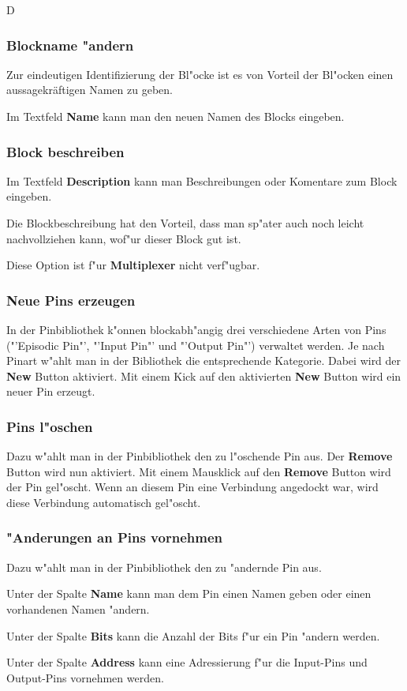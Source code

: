 \documentclass[a4paper,titlepage,12pt,ngerman]{scrbook}
\begin{document}
D
\subsubsection{Blockname "andern}
Zur eindeutigen Identifizierung der Bl"ocke ist es von Vorteil der Bl"ocken einen aussagekräftigen Namen zu geben.\par
Im Textfeld {\bf Name} kann man den neuen Namen des Blocks eingeben.
\subsubsection{Block beschreiben}
Im Textfeld {\bf Description} kann man Beschreibungen oder Komentare zum Block eingeben.\par
Die Blockbeschreibung hat den Vorteil, dass man sp"ater auch noch leicht nachvollziehen kann, wof"ur dieser Block gut ist.\par
Diese Option ist f"ur {\bf Multiplexer} nicht verf"ugbar.
\subsubsection{Neue Pins erzeugen}
In der Pinbibliothek k"onnen blockabh"angig drei verschiedene Arten von Pins ("'Episodic Pin"', "'Input Pin"' und "'Output Pin"') verwaltet werden. Je nach Pinart w"ahlt man in der Bibliothek die entsprechende Kategorie. Dabei wird der {\bf New} Button aktiviert. Mit einem Kick auf den aktivierten {\bf New} Button wird ein neuer Pin erzeugt. \par
\subsubsection{Pins l"oschen}
Dazu w"ahlt man in der Pinbibliothek den zu l"oschende Pin aus. Der {\bf Remove} Button wird nun aktiviert. Mit einem Mausklick auf den {\bf Remove} Button wird der Pin gel"oscht. Wenn an diesem Pin eine Verbindung angedockt war, wird diese Verbindung automatisch gel"oscht.
\subsubsection{"Anderungen an Pins vornehmen}
Dazu w"ahlt man in der Pinbibliothek den zu "andernde Pin aus.\par
Unter der Spalte {\bf Name} kann man dem Pin einen Namen geben oder einen vorhandenen Namen "andern.\par
Unter der Spalte {\bf Bits} kann die Anzahl der Bits f"ur ein Pin "andern werden.\par
Unter der Spalte {\bf Address} kann eine Adressierung f"ur die Input-Pins und Output-Pins vornehmen werden.\par
\end{document}
